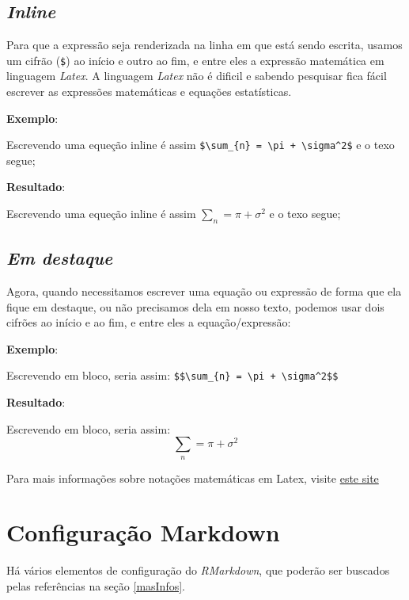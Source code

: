 \documentclass[]{book}
\begin{document}
\hypertarget{inline}{%
\section{\texorpdfstring{\emph{Inline}}{Inline}}\label{inline}}

Para que a expressão seja renderizada na linha em que está sendo escrita, usamos um cifrão (\texttt{\$}) ao início e outro ao fim, e entre eles a expressão matemática em linguagem \emph{Latex}. A linguagem \emph{Latex} não é dificil e sabendo pesquisar fica fácil escrever as expressões matemáticas e equações estatísticas.

\textbf{Exemplo}:

Escrevendo uma equeção inline é assim \texttt{\$\textbackslash{}sum\_\{n\}\ =\ \textbackslash{}pi\ +\ \textbackslash{}sigma\^{}2\$} e o texo segue;

\textbf{Resultado}:

Escrevendo uma equeção inline é assim \(\sum_{n} = \pi + \sigma^2\) e o texo segue;

\hypertarget{em-destaque}{%
\section{\texorpdfstring{\emph{Em destaque}}{Em destaque}}\label{em-destaque}}

Agora, quando necessitamos escrever uma equação ou expressão de forma que ela fique em destaque, ou não precisamos dela em nosso texto, podemos usar dois cifrões ao início e ao fim, e entre eles a equação/expressão:

\textbf{Exemplo}:

Escrevendo em bloco, seria assim: \texttt{\$\$\textbackslash{}sum\_\{n\}\ =\ \textbackslash{}pi\ +\ \textbackslash{}sigma\^{}2\$\$}

\textbf{Resultado}:

Escrevendo em bloco, seria assim: \[\sum_{n} = \pi + \sigma^2\]

Para mais informações sobre notações matemáticas em Latex, visite \href{https://en.wikibooks.org/wiki/LaTeX/Mathematics}{este site}

\hypertarget{MarkdownConfig}{%
\chapter{Configuração Markdown}\label{MarkdownConfig}}

Há vários elementos de configuração do \emph{RMarkdown}, que poderão ser buscados pelas referências na seção \ref{masInfos}.
\end{document}

